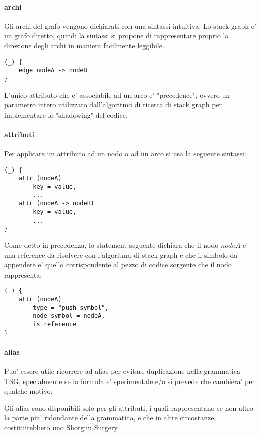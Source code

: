 \paragraph{archi}

Gli archi del grafo vengono dichiarati con una sintassi intuitiva.
Lo stack graph e' un grafo diretto, quindi la sintassi si propone di rappresentare proprio la direzione degli archi in maniera facilmente leggibile.

\begin{verbatim}
(_) {
    edge nodeA -> nodeB
}
\end{verbatim}

L'unico attributo che e' associabile ad un arco e' "precedence", ovvero un parametro intero utilizzato dall'algoritmo di ricerca di stack graph per implementare lo "shadowing" del codice.

\paragraph{attributi}

Per applicare un attributo ad un nodo o ad un arco si usa la seguente sintassi:

\begin{verbatim}
(_) {
    attr (nodeA)
        key = value,
        ...
    attr (nodeA -> nodeB)
        key = value,
        ...
}
\end{verbatim}

Come detto in precedenza, lo statement seguente dichiara che il nodo $nodeA$ e' una reference da risolvere con l'algoritmo di stack graph e che il simbolo da appendere e' quello corrispondente al pezzo di codice sorgente che il nodo rappresenta:

\begin{verbatim}
(_) {
    attr (nodeA)
        type = "push_symbol",
        node_symbol = nodeA,
        is_reference
}
\end{verbatim}

\paragraph{alias}
Puo' essere utile ricorrere ad alias per evitare duplicazione nella grammatica TSG, specialmente se la formula e' sperimentale e/o si prevede che cambiera' per qualche motivo.

Gli alias sono disponibili solo per gli attributi, i quali rappresentano se non altro la parte piu' ridondante della grammatica, e che in altre circostanze costituirebbero uno Shotgun Surgery.

